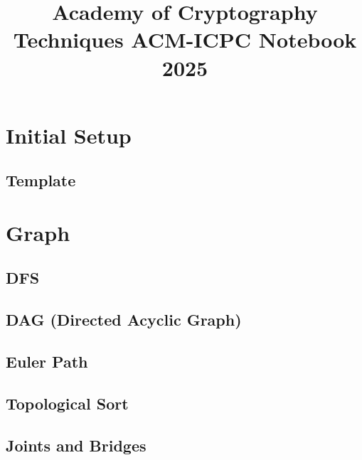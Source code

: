 \documentclass[10pt]{article}
\title{\vspace{-4ex}\Large{Academy of Cryptography Techniques ACM-ICPC Notebook 2025}}
\author{}
\date{}
\begin{document}
\begin{landscape}
\begin{multicols}{2}

\maketitle
\vspace{-13ex}
\tableofcontents
\pagestyle{fancy}


\section{Initial Setup}
\subsection{Template}


\section{Graph}
\subsection{DFS}


\subsection{DAG (Directed Acyclic Graph)}


\subsection{Euler Path}


\subsection{Topological Sort}


\subsection{Joints and Bridges}



\end{multicols}
\end{landscape}
\end{document}
